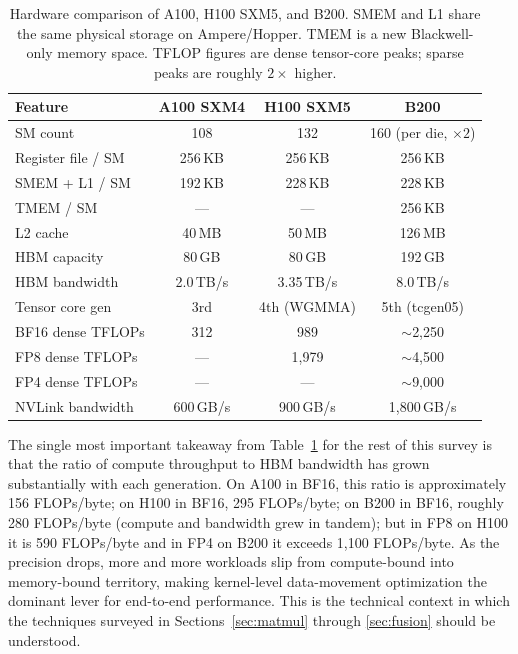 \documentclass[10pt]{article}
\begin{document}
\begin{table}[t]
\caption{Hardware comparison of A100, H100 SXM5, and B200. SMEM and L1 share the same physical storage on Ampere/Hopper. TMEM is a new Blackwell-only memory space. TFLOP figures are dense tensor-core peaks; sparse peaks are roughly $2\times$ higher.}
\label{tab:hw-detailed}
\centering\small
\begin{tabular}{lccc}
\toprule
Feature & A100 SXM4 & H100 SXM5 & B200 \\
\midrule
SM count & 108 & 132 & 160 (per die, $\times 2$) \\
Register file / SM & 256\,KB & 256\,KB & 256\,KB \\
SMEM + L1 / SM & 192\,KB & 228\,KB & 228\,KB \\
TMEM / SM & --- & --- & 256\,KB \\
L2 cache & 40\,MB & 50\,MB & 126\,MB \\
HBM capacity & 80\,GB & 80\,GB & 192\,GB \\
HBM bandwidth & 2.0\,TB/s & 3.35\,TB/s & 8.0\,TB/s \\
Tensor core gen & 3rd & 4th (WGMMA) & 5th (tcgen05) \\
BF16 dense TFLOPs & 312 & 989 & $\sim$2,250 \\
FP8 dense TFLOPs & --- & 1,979 & $\sim$4,500 \\
FP4 dense TFLOPs & --- & --- & $\sim$9,000 \\
NVLink bandwidth & 600\,GB/s & 900\,GB/s & 1,800\,GB/s \\
\bottomrule
\end{tabular}
\end{table}

The single most important takeaway from Table~\ref{tab:hw-detailed} for the rest of this survey is that the ratio of compute throughput to HBM bandwidth has grown substantially with each generation. On A100 in BF16, this ratio is approximately 156 FLOPs/byte; on H100 in BF16, 295 FLOPs/byte; on B200 in BF16, roughly 280 FLOPs/byte (compute and bandwidth grew in tandem); but in FP8 on H100 it is 590 FLOPs/byte and in FP4 on B200 it exceeds 1,100 FLOPs/byte. As the precision drops, more and more workloads slip from compute-bound into memory-bound territory, making kernel-level data-movement optimization the dominant lever for end-to-end performance. This is the technical context in which the techniques surveyed in Sections~\ref{sec:matmul} through \ref{sec:fusion} should be understood.
\end{document}
